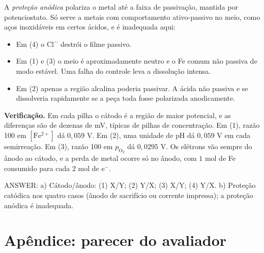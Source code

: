 \documentclass{article}%
\begin{document}
A \emph{proteção anódica} polariza o metal até a faixa de passivação, mantida por potenciostato. Só serve a metais com comportamento ativo-passivo no meio, como aços inoxidáveis em certos ácidos, e é inadequada aqui:
\begin{itemize}
\item Em (4) o $\mathrm{Cl^-}$ destrói o filme passivo.
\item Em (1) e (3) o meio é aproximadamente neutro e o Fe comum não passiva de modo estável. Uma falha do controle leva a dissolução intensa.
\item Em (2) apenas a região alcalina poderia passivar. A ácida não passiva e se dissolveria rapidamente se a peça toda fosse polarizada anodicamente.
\end{itemize}

\textbf{Verificação.} Em cada pilha o cátodo é a região de maior potencial, e as diferenças são de dezenas de mV, típicas de pilhas de concentração. Em (1), razão 100 em $[\mathrm{Fe^{2+}}]$ dá $0{,}059$ V. Em (2), uma unidade de pH dá $0{,}059$ V em cada semirreação. Em (3), razão 100 em $p_{\mathrm{O_2}}$ dá $0{,}0295$ V. Os elétrons vão sempre do ânodo ao cátodo, e a perda de metal ocorre só no ânodo, com $1$ mol de Fe consumido para cada $2$ mol de $\mathrm{e^-}$.

ANSWER: a) Cátodo/ânodo: (1) X/Y; (2) Y/X; (3) X/Y; (4) Y/X. b) Proteção catódica nos quatro casos (ânodo de sacrifício ou corrente impressa); a proteção anódica é inadequada.%
\newpage%
\section*{Apêndice: parecer do avaliador}%
\end{document}
